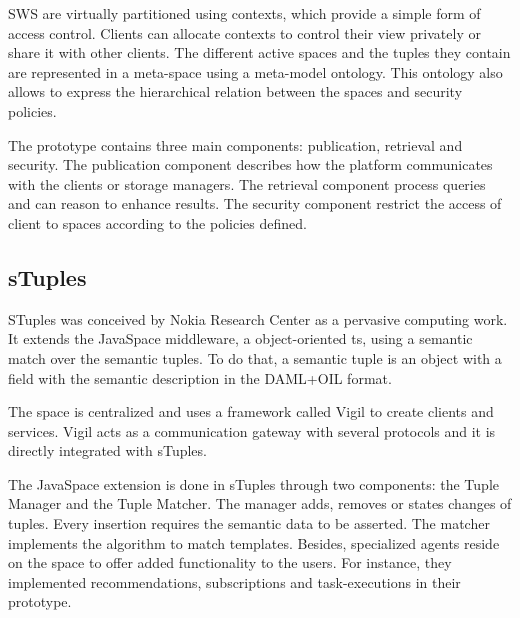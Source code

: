 SWS are virtually partitioned using contexts, which provide a simple form of access control.
Clients can allocate contexts to control their view privately or share it with other clients. %
The different active spaces and the tuples they contain are represented in a meta-space using a meta-model ontology.
This ontology also allows to express the hierarchical relation between the spaces and security policies.

The prototype contains three main components: publication, retrieval and security.
The publication component describes how the platform communicates with the clients or storage managers.
The retrieval component process queries and can reason to enhance results. %
The security component restrict the access of client to spaces according to the policies defined.  %



\subsection{sTuples}

STuples \citep{khushraj_stuples:_2004} was conceived by Nokia Research Center as a pervasive computing work.
It extends the JavaSpace middleware, a object-oriented \acl{ts}, using a semantic match over the semantic tuples.
To do that, a semantic tuple is an object with a field with the semantic description in the DAML+OIL format. %


The space is centralized and uses a framework called Vigil to create clients and services. %
Vigil acts as a communication gateway with several protocols and it is directly integrated with sTuples.


The JavaSpace extension is done in sTuples through two components: the Tuple Manager and the Tuple Matcher.
The manager adds, removes or states changes of tuples.
Every insertion requires the semantic data to be asserted.
The matcher implements the algorithm to match templates.
Besides, specialized agents reside on the space to offer added functionality to the users.
For instance, they implemented recommendations, subscriptions and task-executions in their prototype.



